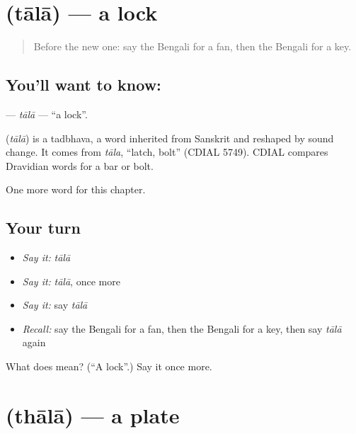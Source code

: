 \section[\texorpdfstring{\bn{তালা} (tālā)}{তালা (tālā)}]{ (tālā) — a lock}

\label{lesson:BN-C62-tala}



\begin{quote}
Before the new one: say the Bengali for a fan, then the Bengali for a key.
\end{quote}

\subsection*{You'll want to know: }
\textbf{} — \emph{tālā} — \textquotedblleft{}a lock\textquotedblright{}.

\begin{cousinweb}
\textbf{} (\emph{tālā}) is a tadbhava, a word inherited from Sanskrit and reshaped by sound change. It comes from \emph{tāla}, \textquotedblleft{}latch, bolt\textquotedblright{} (CDIAL 5749). CDIAL compares Dravidian words for a bar or bolt.
\end{cousinweb}

\begin{grammarlens}[title={What you've built}]
One more word for this chapter.
\end{grammarlens}

\subsection*{Your turn}
\begin{itemize}
\raggedright
  \item \emph{Say it:} \emph{tālā}
  \item \emph{Say it:} \emph{tālā}, once more
  \item \emph{Say it:} say \emph{tālā}
  \item \emph{Recall:} say the Bengali for a fan, then the Bengali for a key, then say \emph{tālā} again
\end{itemize}

\begin{tcolorbox}[breakable,colback=teal!4,colframe=teal!35!black,title={Before you move on}]
What does  mean? (\textquotedblleft{}A lock\textquotedblright{}.) Say it once more.
\end{tcolorbox}
\section[\texorpdfstring{\bn{থালা} (thālā)}{থালা (thālā)}]{ (thālā) — a plate}

